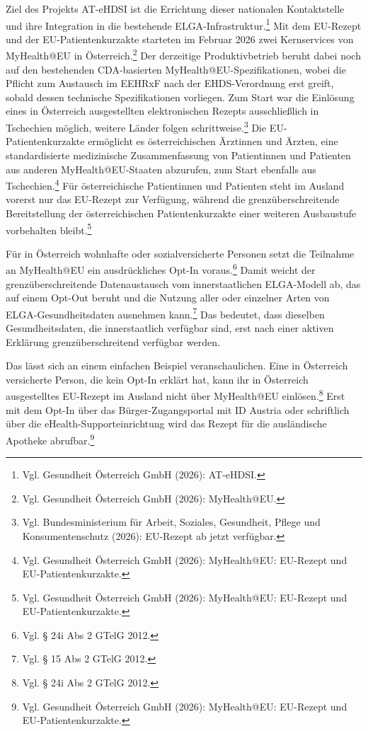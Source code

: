 Ziel des Projekts AT-eHDSI ist die Errichtung dieser nationalen Kontaktstelle und ihre Integration in die bestehende ELGA-Infrastruktur.\footnote{Vgl. Gesundheit Österreich GmbH (2026): AT-eHDSI.} Mit dem EU-Rezept und der EU-Patientenkurzakte starteten im Februar 2026 zwei Kernservices von MyHealth@EU in Österreich.\footnote{Vgl. Gesundheit Österreich GmbH (2026): MyHealth@EU.} Der derzeitige Produktivbetrieb beruht dabei noch auf den bestehenden CDA-basierten MyHealth@EU-Spezifikationen, wobei die Pflicht zum Austausch im EEHRxF nach der EHDS-Verordnung erst greift, sobald dessen technische Spezifikationen vorliegen.
Zum Start war die Einlösung eines in Österreich ausgestellten elektronischen Rezepts ausschließlich in Tschechien möglich, weitere Länder folgen schrittweise.\footnote{Vgl. Bundesministerium für Arbeit, Soziales, Gesundheit, Pflege und Konsumentenschutz (2026): EU-Rezept ab jetzt verfügbar.}
Die EU-Patientenkurzakte ermöglicht es österreichischen Ärztinnen und Ärzten, eine standardisierte medizinische Zusammenfassung von Patientinnen und Patienten aus anderen MyHealth@EU-Staaten abzurufen, zum Start ebenfalls aus Tschechien.\footnote{Vgl. Gesundheit Österreich GmbH (2026): MyHealth@EU: EU-Rezept und EU-Patientenkurzakte.} Für österreichische Patientinnen und Patienten steht im Ausland vorerst nur das EU-Rezept zur Verfügung, während die grenzüberschreitende Bereitstellung der österreichischen Patientenkurzakte einer weiteren Ausbaustufe vorbehalten bleibt.\footnote{Vgl. Gesundheit Österreich GmbH (2026): MyHealth@EU: EU-Rezept und EU-Patientenkurzakte.}

Für in Österreich wohnhafte oder sozialversicherte Personen setzt die Teilnahme an MyHealth@EU ein ausdrückliches Opt-In voraus.\footnote{Vgl. § 24i Abs 2 GTelG 2012.} Damit weicht der grenzüberschreitende Datenaustausch vom innerstaatlichen ELGA-Modell ab, das auf einem Opt-Out beruht und die Nutzung aller oder einzelner Arten von ELGA-Gesundheitsdaten ausnehmen kann.\footnote{Vgl. § 15 Abs 2 GTelG 2012.} Das bedeutet, dass dieselben Gesundheitsdaten, die innerstaatlich verfügbar sind, erst nach einer aktiven Erklärung grenzüberschreitend verfügbar werden.

Das lässt sich an einem einfachen Beispiel veranschaulichen. Eine in Österreich versicherte Person, die kein Opt-In erklärt hat, kann ihr in Österreich ausgestelltes EU-Rezept im Ausland nicht über MyHealth@EU einlösen.\footnote{Vgl. § 24i Abs 2 GTelG 2012.} Erst mit dem Opt-In über das Bürger-Zugangsportal mit ID Austria oder schriftlich über die eHealth-Supporteinrichtung wird das Rezept für die ausländische Apotheke abrufbar.\footnote{Vgl. Gesundheit Österreich GmbH (2026): MyHealth@EU: EU-Rezept und EU-Patientenkurzakte.}

